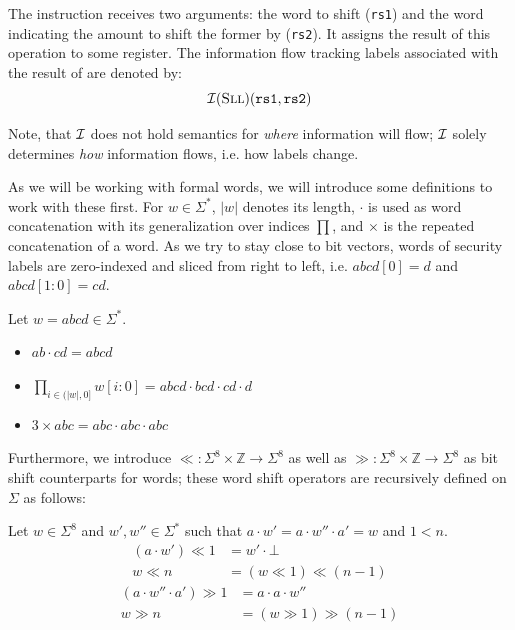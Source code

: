 \begin{example}
    The  instruction receives two arguments: the word to shift (\texttt{rs1}) and the word indicating the amount to shift the former by (\texttt{rs2}).
    It assigns the result of this operation to some register.
    The information flow tracking labels associated with the result of  are denoted by:
    \begin{equation*}
        \mathcal{I}(\textsc{Sll})(\texttt{rs1}, \texttt{rs2})
    \end{equation*}

    Note, that $ \mathcal{I} $ does not hold semantics for \textit{where} information will flow; $ \mathcal{I} $ solely determines \textit{how} information flows, i.e. how labels change.
\end{example}

As we will be working with formal words, we will introduce some definitions to work with these first.
For $ w  \in \Sigma^* $, $ |w| $ denotes its length,
$ \cdot $ is used as word concatenation with its generalization over indices $ \prod $, and $ \times $ is the repeated concatenation of a word.
As we try to stay close to bit vectors, words of security labels are zero-indexed and sliced from right to left, i.e. $ abcd[0] = d $ and $ abcd[1:0] = cd $.

\begin{example}
    Let $ w = abcd \in \Sigma^* $.
    \begin{itemize}
        \item $ ab \cdot cd = abcd $
        \item $ \prod_{i \in (|w|, 0]} w[i:0] = abcd \cdot bcd \cdot cd \cdot d $
        \item $ 3 \times abc = abc \cdot abc \cdot abc $
    \end{itemize}
\end{example}

Furthermore, we introduce $ \ll : \Sigma^8 \times \mathbb{Z} \rightarrow \Sigma^8 $ as well as $ \gg : \Sigma^8 \times \mathbb{Z} \rightarrow \Sigma^8 $ as bit shift counterparts for words; these word shift operators are recursively defined on $ \Sigma $ as follows:

Let $ w \in \Sigma^8 $ and $ w', w'' \in \Sigma^* $ such that $ a \cdot w' = a \cdot w'' \cdot a' = w $ and $ 1 < n $.
\begin{align*}
    (a \cdot w') \ll 1 &= w' \cdot \bot \\
    w \ll n &= (w \ll 1) \ll (n - 1)
\end{align*}
\begin{align*}
    (a \cdot w'' \cdot a') \gg 1 &= a \cdot a \cdot w'' \\
    w \gg n &= (w \gg 1) \gg (n - 1)
\end{align*}

